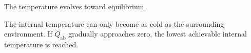The temperature evolves toward equilibrium.  

The internal temperature can only become as cold as the surrounding environment. If \( \dot{Q}_{\text{ab}} \) gradually approaches zero, the lowest achievable internal temperature is reached.